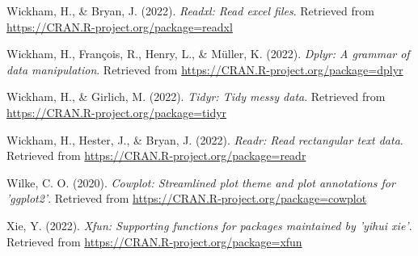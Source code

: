 \documentclass[
  man,floatsintext]{apa6}
\newlength{\cslhangindent}
\newlength{\cslentryspacingunit} %
\newenvironment{CSLReferences}[2] %
 {%
  \setlength{\parindent}{0pt}
  \ifodd #1
  \let\oldpar\par
  \def\par{\hangindent=\cslhangindent\oldpar}
  \fi
  \setlength{\parskip}{#2\cslentryspacingunit}
 }%
 {}
\begin{document}
\begin{CSLReferences}{1}{0}
\leavevmode{}%
Wickham, H., \& Bryan, J. (2022). \emph{Readxl: Read excel files}. Retrieved from \url{https://CRAN.R-project.org/package=readxl}

\leavevmode{}%
Wickham, H., François, R., Henry, L., \& Müller, K. (2022). \emph{Dplyr: A grammar of data manipulation}. Retrieved from \url{https://CRAN.R-project.org/package=dplyr}

\leavevmode{}%
Wickham, H., \& Girlich, M. (2022). \emph{Tidyr: Tidy messy data}. Retrieved from \url{https://CRAN.R-project.org/package=tidyr}

\leavevmode{}%
Wickham, H., Hester, J., \& Bryan, J. (2022). \emph{Readr: Read rectangular text data}. Retrieved from \url{https://CRAN.R-project.org/package=readr}

\leavevmode{}%
Wilke, C. O. (2020). \emph{Cowplot: Streamlined plot theme and plot annotations for 'ggplot2'}. Retrieved from \url{https://CRAN.R-project.org/package=cowplot}

\leavevmode{}%
Xie, Y. (2022). \emph{Xfun: Supporting functions for packages maintained by 'yihui xie'}. Retrieved from \url{https://CRAN.R-project.org/package=xfun}

\end{CSLReferences}
\end{document}
